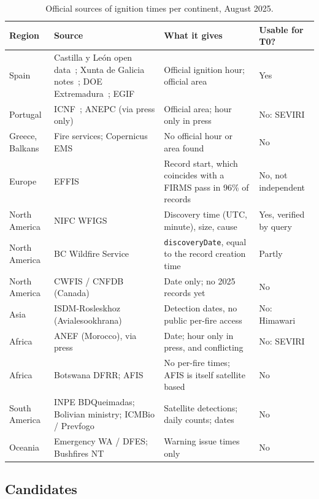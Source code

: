 \documentclass[11pt]{article}
\begin{document}
\begin{longtable}{|p{2.0cm}|p{4.2cm}|p{5.0cm}|p{2.6cm}|}
\caption{Official sources of ignition times per continent, August 2025.}\label{tab:groundtruth}\\
\hline
\rowcolor{tablehead}
\textbf{Region} & \textbf{Source} & \textbf{What it gives} & \textbf{Usable for T0?} \\
\hline
\endhead
Spain & Castilla y Le\'on open data~\cite{jcyl2025incendios}; Xunta de Galicia notes~\cite{xunta2025larouco,xunta2025oimbra}; DOE Extremadura~\cite{doe2025jarilla}; EGIF~\cite{miteco2025avance} & Official ignition hour; official area & Yes \\
\hline
Portugal & ICNF~\cite{icnf2025relatorio8}; ANEPC (via press only) & Official area; hour only in press & No: SEVIRI \\
\hline
Greece, Balkans & Fire services; Copernicus EMS & No official hour or area found & No \\
\hline
Europe & EFFIS & Record start, which coincides with a FIRMS pass in 96\% of records & No, not independent \\
\hline
North America & NIFC WFIGS~\cite{nifc2025wfigs} & Discovery time (UTC, minute), size, cause & Yes, verified by query \\
\hline
North America & BC Wildfire Service~\cite{bcws2025underwood} & \texttt{discoveryDate}, equal to the record creation time & Partly \\
\hline
North America & CWFIS / CNFDB (Canada) & Date only; no 2025 records yet & No \\
\hline
Asia & ISDM-Rosleskhoz (Avialesookhrana) & Detection dates, no public per-fire access & No: Himawari \\
\hline
Africa & ANEF (Morocco), via press & Date; hour only in press, and conflicting & No: SEVIRI \\
\hline
Africa & Botswana DFRR; AFIS & No per-fire times; AFIS is itself satellite based & No \\
\hline
South America & INPE BDQueimadas; Bolivian ministry; ICMBio / Prevfogo & Satellite detections; daily counts; dates & No \\
\hline
Oceania & Emergency WA / DFES; Bushfires NT & Warning issue times only & No \\
\hline
\end{longtable}

\subsection{Candidates}\label{subsec:candidates}
\end{document}
